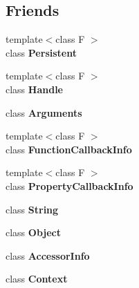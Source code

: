 \subsection*{Friends}
\begin{DoxyCompactItemize}
\item 
\hypertarget{classv8_1_1_local_afaadbbd2553180545a4e018c3eeac71e}{}{\footnotesize template$<$class F $>$ }\\class {\bfseries Persistent}\label{classv8_1_1_local_afaadbbd2553180545a4e018c3eeac71e}

\item 
\hypertarget{classv8_1_1_local_a67ca1a2d91273eaf85fb3d23ba8ce984}{}{\footnotesize template$<$class F $>$ }\\class {\bfseries Handle}\label{classv8_1_1_local_a67ca1a2d91273eaf85fb3d23ba8ce984}

\item 
\hypertarget{classv8_1_1_local_acbd2a21b98cd2cb694fd02340724b625}{}class {\bfseries Arguments}\label{classv8_1_1_local_acbd2a21b98cd2cb694fd02340724b625}

\item 
\hypertarget{classv8_1_1_local_a76786e6fa2d0eac5e2d4f647659d0d23}{}{\footnotesize template$<$class F $>$ }\\class {\bfseries Function\+Callback\+Info}\label{classv8_1_1_local_a76786e6fa2d0eac5e2d4f647659d0d23}

\item 
\hypertarget{classv8_1_1_local_a5018adab21fade2b42f4f60e45fa1083}{}{\footnotesize template$<$class F $>$ }\\class {\bfseries Property\+Callback\+Info}\label{classv8_1_1_local_a5018adab21fade2b42f4f60e45fa1083}

\item 
\hypertarget{classv8_1_1_local_a7fb804f7dc96dd9f705c84095f37f1ca}{}class {\bfseries String}\label{classv8_1_1_local_a7fb804f7dc96dd9f705c84095f37f1ca}

\item 
\hypertarget{classv8_1_1_local_a0720b5f434e636e22a3ed34f847eec57}{}class {\bfseries Object}\label{classv8_1_1_local_a0720b5f434e636e22a3ed34f847eec57}

\item 
\hypertarget{classv8_1_1_local_aa6da8bc2cce791f1f1358707f98c45d1}{}class {\bfseries Accessor\+Info}\label{classv8_1_1_local_aa6da8bc2cce791f1f1358707f98c45d1}

\item 
\hypertarget{classv8_1_1_local_ac26c806e60ca4a0547680edb68f6e39b}{}class {\bfseries Context}\label{classv8_1_1_local_ac26c806e60ca4a0547680edb68f6e39b}


\end{DoxyCompactItemize}
